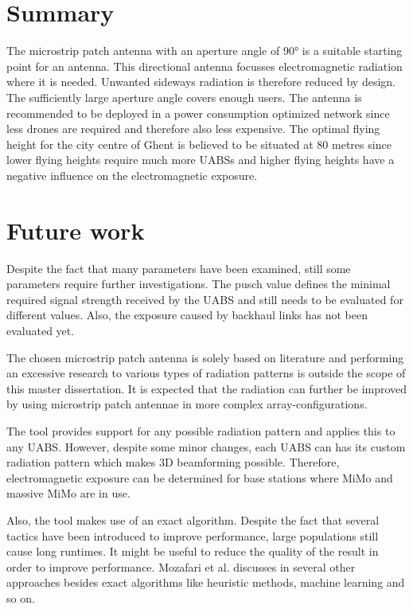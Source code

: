 \section{Summary}
The microstrip patch antenna with an aperture angle of \ang{90} is a suitable starting point for an antenna. 
This directional antenna focusses electromagnetic radiation where it is needed. Unwanted sideways radiation 
is therefore reduced by design.
The sufficiently large aperture angle covers enough users. The antenna is recommended to be deployed in a power consumption 
optimized network since less drones are required and therefore also less expensive.
The optimal flying height for the city centre of Ghent is believed to be situated at 80 metres since lower flying heights require much more \gls{UABS}s and
higher flying heights have a negative influence on the electromagnetic exposure.  

\section{Future work}

Despite the fact that many parameters have been examined, still some parameters require further investigations.
The \gls{pusch} value defines the minimal required signal strength received by the \gls{UABS} and still needs to be evaluated
for different values. Also, the exposure caused by backhaul links has not been evaluated yet.

The chosen microstrip patch antenna is solely based on literature and performing an excessive research to various 
types of radiation patterns is outside the scope of this master dissertation. It is expected that the radiation can 
further be improved by using microstrip patch antennae in more complex array-configurations. 

The tool provides support for any possible radiation pattern and applies this to any \gls{UABS}.
However, despite some minor changes, each \gls{UABS} can has its custom radiation pattern which makes 
3D beamforming possible. Therefore, electromagnetic exposure can be determined for base stations where MiMo
and massive MiMo are in use.

Also, the tool makes use of an \gls{exact algorithm}. Despite the fact that several  
tactics have been introduced to improve performance, large populations still cause long runtimes. It might be useful 
to reduce the quality of the result in order to improve performance. Mozafari et al. discusses in \cite{U3} several 
other approaches besides \gls{exact algorithm}s like heuristic methods, machine learning and so on.